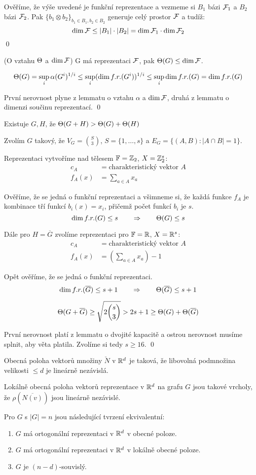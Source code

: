 Ověříme, že výše uvedené je funkční reprezentace a vezmeme si $B_1$ bázi
$\mathcal{F}_1$ a $B_2$ bázi $\mathcal{F}_2$. Pak $\{b_1 \otimes b_2\}_{b_1\in B_1, b_2\in
B_2}$ generuje celý prostor $\mathcal{F}$ a tudíž:
$$
	\dim\mathcal{F} \le |B_1|\cdot |B_2| = \dim\mathcal{F}_1 \cdot \dim\mathcal{F}_2
$$
\qed

\lm(O vztahu $\Theta$ a $\dim\mathcal{F}$) G má reprezentaci $\mathcal{F}$, pak $\Theta(G)
\leq \dim \mathcal{F}$.

\dk 
$$\Theta(G) = \sup_i \alpha(G^i)^{1/i} \leq \sup_i(\dim f.r.(G^i))^{1/i} \leq \sup_i\dim f.r. (G) = \dim f.r.(G)$$

První nerovnost plyne z lemmatu o vztahu $\alpha$ a $\dim\mathcal{F}$, druhá z
lemmatu o dimenzi součinu reprezentací.
\qed


\vt Existuje $G, H$, že $\Theta(G+H) > \Theta(G) + \Theta(H)$

\dk Zvolím $G$ takový, že $V_G={S\choose 3}$, $S = \{1, \dots, s\}$ a $E_G = \{ (A, B): |A\cap B| = 1\}$. 

Reprezentaci vytvoříme nad tělesem $\mathbb{F} = \mathbb{Z}_2$, $X = \mathbb{Z}_2^s$:
\begin{align*}
	c_A &= \text{charakteristický vektor } A \\ 
	f_A(x) &= \sum_{a\in A} x_a
\end{align*}

Ověříme, že se jedná o funkční reprezentaci a všimneme si, že každá
funkce $f_A$ je kombinace tří funkcí $b_i(x) = x_i$, přičemž počet funkcí
$b_i$ je $s$.
$$
\dim f.r.(G) \le s \qquad\Rightarrow\qquad \Theta(G) \le s
$$

Dále pro $H = \overline G$ zvolíme reprezentaci pro $\mathbb{F} = \mathbb{R}$, $X =
\mathbb{R}^s$:
\begin{align*}
	c_A &= \text{charakteristický vektor } A \\ 
	f_A(x) &= (\sum_{a\in A} x_a) - 1
\end{align*}

Opět ověříme, že se jedná o funkční reprezentaci.
$$
\dim f.r.(\overline G) \le s+1 \qquad\Rightarrow\qquad \Theta(\overline G) \le s+1
$$

$$\Theta(G + \overline G) \ge \sqrt{2{s\choose 3}} > 2s+1 \ge \Theta(G) + \Theta(\overline G)$$

První nerovnost platí z lemmatu o dvojité kapacitě a ostrou nerovnost
musíme splnit, aby věta platila. Zvolíme si tedy $s \ge 16$.
\qed

\df Obecná poloha vektorů množiny $\check N$ v  $\mathbb{R}^d$ je taková, že libovolná podmnožina velikosti $\leq d$ je lineárně nezávislá.

\df Lokálně obecná poloha vektorů reprezentace v $\mathbb{R}^d$ na grafu $G$ jsou takové vrcholy, že $\rho(\overline{N(v)})$ jsou lineárně nezávislé.

\vt Pro $G$ s $|G| = n$ jsou následující tvrzení ekvivalentní:
\begin{enumerate}
	\item $G$ má ortogonální reprezentaci v $\mathbb{R}^d$ v obecné poloze.
	\item $G$ má ortogonální reprezentaci v $\mathbb{R}^d$ v lokálně obecné poloze.
	\item $G$ je $(n-d)$-souvislý.
\end{enumerate}


